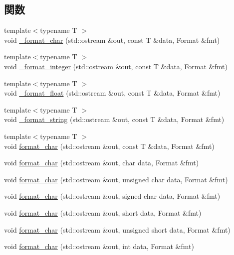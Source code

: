 \subsection*{関数}
\begin{DoxyCompactItemize}
\item 
{\footnotesize template$<$typename T $>$ }\\void \hyperlink{namespacecp_a94c381cbbf87a4688d2f47e52e03b867}{\_\-format\_\-char} (std::ostream \&out, const T \&data, Format \&fmt)
\item 
{\footnotesize template$<$typename T $>$ }\\void \hyperlink{namespacecp_a5341cb723c5abcaf856cbdf65e182885}{\_\-format\_\-integer} (std::ostream \&out, const T \&data, Format \&fmt)
\item 
{\footnotesize template$<$typename T $>$ }\\void \hyperlink{namespacecp_a9eacdefc85b69ce28ce1ba0d7e180db1}{\_\-format\_\-float} (std::ostream \&out, const T \&data, Format \&fmt)
\item 
{\footnotesize template$<$typename T $>$ }\\void \hyperlink{namespacecp_a9c55f61eeac5536687ef506f543968de}{\_\-format\_\-string} (std::ostream \&out, const T \&data, Format \&fmt)
\item 
{\footnotesize template$<$typename T $>$ }\\void \hyperlink{namespacecp_a6da87dd806888f3952a6a1b0097f86cf}{format\_\-char} (std::ostream \&out, const T \&data, Format \&fmt)
\item 
void \hyperlink{namespacecp_aae138ed98d6c597a9af56b153e268eae}{format\_\-char} (std::ostream \&out, char data, Format \&fmt)
\item 
void \hyperlink{namespacecp_aa4f0b57ce9dab1bd82680699afbb9fec}{format\_\-char} (std::ostream \&out, unsigned char data, Format \&fmt)
\item 
void \hyperlink{namespacecp_acc4c174685064092b17978375387358a}{format\_\-char} (std::ostream \&out, signed char data, Format \&fmt)
\item 
void \hyperlink{namespacecp_a9f48feafb852220f8e2baa551abca2af}{format\_\-char} (std::ostream \&out, short data, Format \&fmt)
\item 
void \hyperlink{namespacecp_a692ac8f80fe2d8f482bd1c6cc4518219}{format\_\-char} (std::ostream \&out, unsigned short data, Format \&fmt)
\item 
void \hyperlink{namespacecp_ad0a44d88420011ebcb330f4df4ac2a7a}{format\_\-char} (std::ostream \&out, int data, Format \&fmt)

\end{DoxyCompactItemize}
